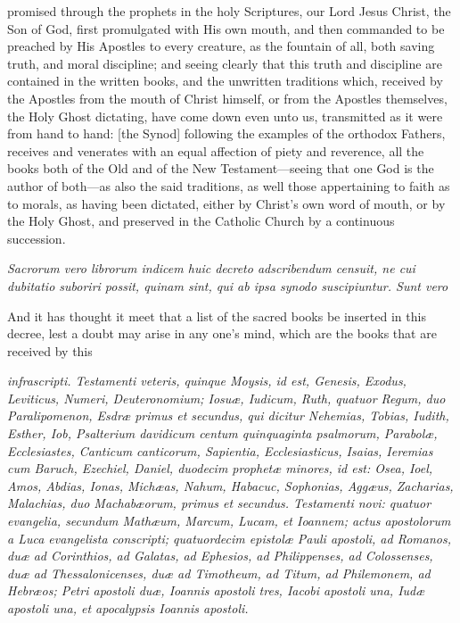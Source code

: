 promised through the prophets in the holy Scriptures, our Lord Jesus Christ, the Son of God, first promulgated with His own mouth, and then commanded to be preached by His Apostles to every creature, as the fountain of all, both saving truth, and moral discipline; and seeing clearly that this truth and discipline are contained in the written books, and the unwritten traditions which, received by the Apostles from the mouth of Christ himself, or from the Apostles themselves, the Holy Ghost dictating, have come down even unto us, transmitted as it were from hand to hand: [the Synod] following the examples of the orthodox Fathers, receives and venerates with an equal affection of piety and reverence, all the books both of the Old and of the New Testament—seeing that one God is the author of both—as also the said traditions, as well those appertaining to faith as to morals, as having been dictated, either by Christ's own word of mouth, or by the Holy Ghost, and preserved in the Catholic Church by a continuous succession.

\emph{Sacrorum vero librorum indicem huic decreto adscribendum censuit, ne cui dubitatio suboriri possit, quinam sint, qui ab ipsa synodo suscipiuntur. Sunt vero }

And it has thought it meet that a list of the sacred books be inserted in this decree, lest a doubt may arise in any one's mind, which are the books that are received by this

\emph{infrascripti. Testamenti veteris, quinque Moysis, id est, Genesis, Exodus, Leviticus, Numeri, Deuteronomium; Iosuæ, Iudicum, Ruth, quatuor Regum, duo Paralipomenon, Esdræ primus et secundus, qui dicitur Nehemias, Tobias, Iudith, Esther, Iob, Psalterium davidicum centum quinquaginta psalmorum, Parabolæ, Ecclesiastes, Canticum canticorum, Sapientia, Ecclesiasticus, Isaias, Ieremias cum Baruch, Ezechiel, Daniel, duodecim prophetæ minores, id est: Osea, Ioel, Amos, Abdias, Ionas, Michæas, Nahum, Habacuc, Sophonias, Aggæus, Zacharias, Malachias, duo Machabæorum, primus et secundus. Testamenti novi: quatuor evangelia, secundum Mathæum, Marcum, Lucam, et Ioannem; actus apostolorum a Luca evangelista conscripti; quatuordecim epistolæ Pauli apostoli, ad Romanos, duæ ad Corinthios, ad Galatas, ad Ephesios, ad Philippenses, ad Colossenses, duæ ad Thessalonicenses, duæ ad Timotheum, ad Titum, ad Philemonem, ad Hebræos; Petri apostoli duæ, Ioannis apostoli tres, Iacobi apostoli una, Iudæ apostoli una, et apocalypsis Ioannis apostoli.}

